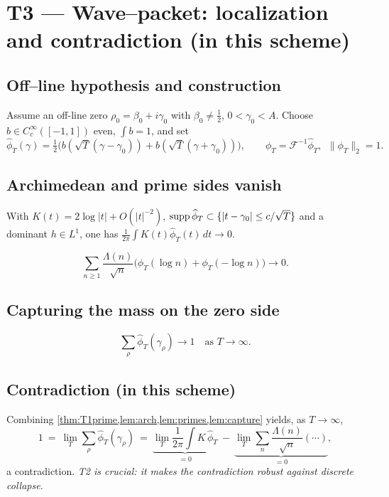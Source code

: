 \documentclass[11pt,a4paper]{proofarticle}
\begin{document}
\section{T3 — Wave–packet: localization and contradiction (in this scheme)}
\subsection{Off–line hypothesis and construction}
Assume an off-line zero $\rho_0=\beta_0+i\gamma_0$ with $\beta_0\ne \frac12$, $0<\gamma_0<A$.
Choose $b\in C_c^\infty([-1,1])$ even, $\int b=1$, and set
\[
\widehat\phi_T(\gamma)=\tfrac12\Big(b(\sqrt{T}(\gamma-\gamma_0))+b(\sqrt{T}(\gamma+\gamma_0))\Big),\qquad
\phi_T=\mathcal{F}^{-1}\widehat\phi_T,\ \ \|\phi_T\|_2=1.
\]

\subsection{Archimedean and prime sides vanish}
\begin{lemma}[Archimedean $\to 0$]\label{lem:arch}
With $K(t)=2\log|t|+O(|t|^{-2})$, $\operatorname{supp} \widehat\phi_T\subset\{|t-\gamma_0|\le c/\sqrt{T}\}$ and a dominant
$h\in L^1$, one has $\frac{1}{2\pi}\int K(t)\widehat\phi_T(t)\,dt\to 0$.
\end{lemma}

\begin{lemma}\label{lem:primes}
\[
\sum_{n\ge 1}\frac{\Lambda(n)}{\sqrt n}\big(\phi_T(\log n)+\phi_T(-\log n)\big)\to 0.
\]
\end{lemma}

\subsection{Capturing the mass on the zero side}
\begin{lemma}[Capture]\label{lem:capture}
\[
\sum_{\rho}\widehat\phi_T(\gamma_\rho)\to 1\quad\text{as }T\to\infty.
\]
\end{lemma}

\subsection{Contradiction (in this scheme)}
Combining \cref{thm:T1prime,lem:arch,lem:primes,lem:capture} yields, as $T\to\infty$,
\[
1\ =\ \lim_{T}\sum_{\rho}\widehat\phi_T(\gamma_\rho)\ =\
\underbrace{\lim_{T}\frac{1}{2\pi}\int K\,\widehat\phi_T}_{=0}\ -\
\underbrace{\lim_{T}\sum_{n}\frac{\Lambda(n)}{\sqrt n}(\cdots)}_{=0},
\]
a contradiction. \emph{T2 is crucial: it makes the contradiction robust against discrete collapse.}
\end{document}
